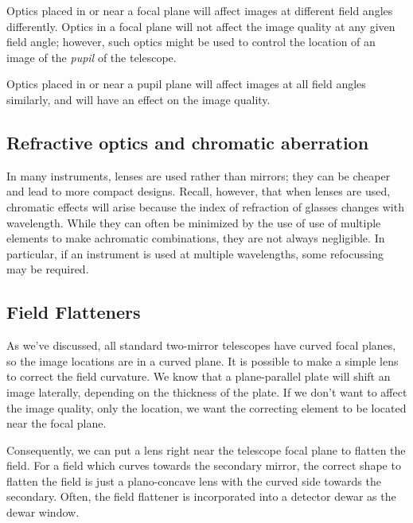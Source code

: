 \documentclass[12pt]{article}
\begin{document}
Optics placed in or near a focal plane will affect images at different
field angles differently. Optics in a focal plane will not affect the
image quality at any given field angle; however, such optics might be
used to control the location of an image of the \emph{pupil} of the
telescope.

Optics placed in or near a pupil plane will affect images at all field
angles similarly, and will have an effect on the image quality.

\subsection{Refractive optics and chromatic aberration}
In many instruments, lenses are used rather than mirrors; they can be
cheaper and lead to more compact designs. Recall, however, that when
lenses are used, chromatic effects will arise because the index of
refraction of glasses changes with wavelength. While they can often be
minimized by the use of use of multiple elements to make achromatic
combinations, they are not always negligible. In particular, if an
instrument is used at multiple wavelengths, some refocussing may be
required.

\subsection{Field Flatteners}
As we've discussed, all standard two-mirror telescopes have curved
focal planes, so the image locations are in a curved plane.
It is possible to make a simple lens to correct the
field curvature. We know that a plane-parallel plate will shift an
image laterally, depending on the thickness of the plate. If we don't
want to affect the image quality, only the location, we want the
correcting element to be located near the focal plane.

Consequently, we can put a lens right near the telescope focal plane to
flatten the field. For a field which curves towards the secondary
mirror, the correct shape to flatten the field is just
a plano-concave lens with the curved side towards the secondary.
Often, the field flattener is incorporated into a detector dewar as
the dewar window.
\end{document}
